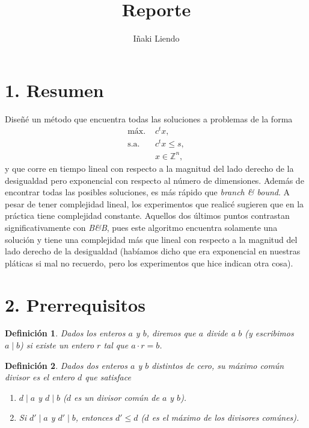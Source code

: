\documentclass[11pt]{article}
\title{Reporte}
\author{Iñaki Liendo}
\newtheorem{definition}{Definición}
\begin{document}
\maketitle

\section*{1. Resumen}

Diseñé un método que encuentra todas las soluciones a problemas de la forma
\begin{align*}
	\text{máx. } & c^tx, \\
	\text{s.a. } & c^tx \leq s, \\
				 & x \in \mathbb{Z}^n,
\end{align*}
y que corre en tiempo lineal con respecto a la magnitud del lado derecho de la desigualdad pero
exponencial con respecto al número de dimensiones. Además de encontrar todas las posibles
soluciones, es más rápido que \textit{branch \& bound}. A pesar de tener complejidad lineal, los
experimentos que realicé sugieren que en la práctica tiene complejidad constante. Aquellos dos
últimos puntos contrastan significativamente con \textit{B\&B}, pues este algoritmo encuentra
solamente una solución y tiene una complejidad más que lineal con respecto a la magnitud del lado
derecho de la desigualdad (habíamos dicho que era exponencial en nuestras pláticas si mal no
recuerdo, pero los experimentos que hice indican otra cosa).

\section*{2. Prerrequisitos}

\begin{definition}
	Dados los enteros $a$ y $b$, diremos que $a$ divide a $b$ (y escribimos $a \mid b$) si existe un
	entero $r$ tal que $a \cdot r = b$.
\end{definition}

\begin{definition}
	\label{def:gcd}
	Dados dos enteros $a$ y $b$ distintos de cero, su máximo común divisor es el entero $d$ que satisface
	\begin{enumerate}
		\item $d \mid a$ y $d \mid b$ ($d$ es un divisor común de $a$ y $b$).
		\item Si $d' \mid a$ y $d' \mid b$, entonces $d' \leq d$ ($d$ es el máximo de los divisores comúnes).
	\end{enumerate}
\end{definition}
\end{document}

